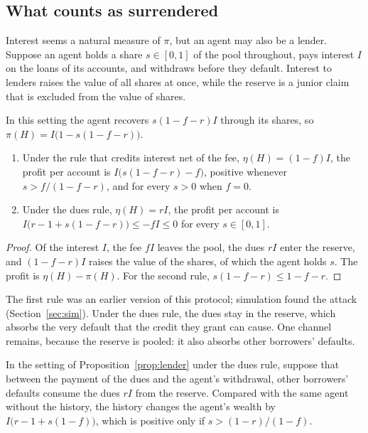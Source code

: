 \documentclass[acmsmall,nonacm,screen]{acmart}
\theoremstyle{acmdefinition}%
\begin{document}
\subsection{What counts as surrendered}\label{sec:dues}

Interest seems a natural measure of $\pi$, but an agent may also be a lender. Suppose an agent holds
a share $s\in[0,1]$ of the pool throughout, pays interest $I$ on the loans of its accounts, and
withdraws before they default. Interest to lenders raises the value of all shares at once, while the
reserve is a junior claim that is excluded from the value of shares.

\begin{proposition}\label{prop:lender}
In this setting the agent recovers $s(1-f-r)I$ through its shares, so $\pi(H)=I\bigl(1-s(1-f-r)\bigr)$.
\begin{enumerate}
\item Under the rule that credits interest net of the fee, $\eta(H)=(1-f)I$, the profit per account is
  $I\bigl(s(1-f-r)-f\bigr)$, positive whenever $s>f/(1-f-r)$, and for every $s>0$ when $f=0$.
\item Under the dues rule, $\eta(H)=rI$, the profit per account is
  $I\bigl(r-1+s(1-f-r)\bigr)\le-fI\le0$ for every $s\in[0,1]$.
\end{enumerate}
\end{proposition}

\begin{proof}
Of the interest $I$, the fee $fI$ leaves the pool, the dues $rI$ enter the reserve, and
$(1-f-r)I$ raises the value of the shares, of which the agent holds $s$. The profit is
$\eta(H)-\pi(H)$. For the second rule, $s(1-f-r)\le1-f-r$.
\end{proof}

The first rule was an earlier version of this protocol; simulation found the attack
(Section~\ref{sec:sim}). Under the dues rule, the dues stay in the reserve, which absorbs the very
default that the credit they grant can cause. One channel remains, because the reserve is pooled:
it also absorbs other borrowers' defaults.

\begin{proposition}\label{prop:pooled}
In the setting of Proposition~\ref{prop:lender} under the dues rule, suppose that between the payment
of the dues and the agent's withdrawal, other borrowers' defaults consume the dues $rI$ from the
reserve. Compared with the same agent without the history, the history changes the agent's wealth by
$I\bigl(r-1+s(1-f)\bigr)$, which is positive only if $s>(1-r)/(1-f)$.
\end{proposition}
\end{document}
